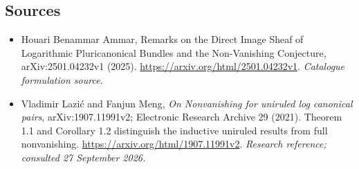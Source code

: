 \documentclass[11pt,a4paper]{article}
\numberwithin{equation}{section}
\begin{document}
\subsection{Sources}
\begin{itemize}\raggedright
\item[\textnormal{[S1]}]\hypertarget{source:194:1}{} Houari Benammar Ammar, Remarks on the Direct Image Sheaf of Logarithmic Pluricanonical Bundles and the Non-Vanishing Conjecture, arXiv:2501.04232v1 (2025).
\url{https://arxiv.org/html/2501.04232v1}.
{\small\textit{Catalogue formulation source.}}
\item[\textnormal{[E1]}]\hypertarget{extra:194:1}{} Vladimir Lazi\'c and Fanjun Meng, \emph{On Nonvanishing for uniruled log canonical pairs}, arXiv:1907.11991v2; Electronic Research Archive 29 (2021). Theorem 1.1 and Corollary 1.2 distinguish the inductive uniruled results from full nonvanishing.
\url{https://arxiv.org/html/1907.11991v2}.
{\small\textit{Research reference; consulted 27 September 2026.}}
\end{itemize}
\end{document}
